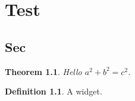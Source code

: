 \documentclass{book}
\newtheorem{theorem}{Theorem}[section]
\theoremstyle{definition}
\newtheorem{definition}{Definition}[section]
\begin{document}
\chapter{Test}
\section{Sec}
\begin{theorem}\label{t:x} Hello $a^2+b^2=c^2$.\end{theorem}
\begin{definition}\label{d:y} A widget.\end{definition}
\end{document}

